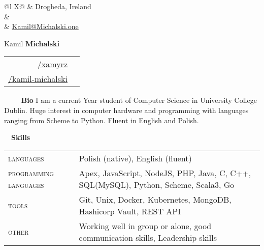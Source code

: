 \documentclass[a4paper, 11pt]{article}
\newcommand{\sectitle}[2]{\large{#1} \ \ \Large{\textbf{#2}}}
\begin{document}
	\pagestyle{fancy}

	\begin{center}
	\begin{multicols}{3}
		\begin{tabularx}{\linewidth}{@{}l X@{}}
			\faMapMarker & Drogheda, Ireland \\
			\IfFileExists{confidential.tex}{\faPhone & \href{tel:\phoneNumber}{\prettyPhoneNumber} \\}{}
			\faEnvelope	 & \href{mailto:Kamil@Michalski.one}{Kamil@Michalski.one} \\
		\end{tabularx} \vfill \null

		\columnbreak
			{ \Huge{Kamil \textbf{Michalski}}}
		\columnbreak

		\begin{tabularx}{\linewidth}{R | r}
				\href{https://github.com/xamyrz}{/xamyrz} & \faGithub \\
				\href{https://www.linkedin.com/in/kamil-michalski-7069451ab/}{/kamil-michalski} & \faLinkedin \\
		\end{tabularx} \vfill \null
	\end{multicols}
	\end{center}

	\vspace{-3.5mm}
	\begin{section}{\sectitle{\ \faUser}{\ Bio}}
		I am a current  Year student of Computer Science in University College Dublin. Huge interest in computer hardware and programming with languages ranging from Scheme to Python. Fluent in English and Polish. \\
	\end{section}
	\vspace{-3.5mm}

	\newcommand{\education}[6]{
		\textsc{#1} & #3: \textbf{#4} & \small{#5} \\[-0.5ex]
		\textsc{#2} & \multicolumn{2}{l}{\footnotesize #6}\\
	}

		\begin{section}{\sectitle{\faCogs}{Skills}}
		\begin{tabularx}{\linewidth}{@{}l  X}
			\textsc{languages} & Polish (native), English (fluent)\\
			\textsc{programming languages} & Apex, JavaScript, NodeJS, PHP, Java, C, C++, SQL(MySQL), Python, Scheme, Scala3, Go \\
			\textsc{tools} & Git, Unix, Docker, Kubernetes, MongoDB, Hashicorp Vault, REST API \\
			\textsc{other} & Working well in group or alone, good communication skills, Leadership skills
		\end{tabularx}
		\\ \\
	\end{section}
	\vspace{-3.5mm}
\end{document}
